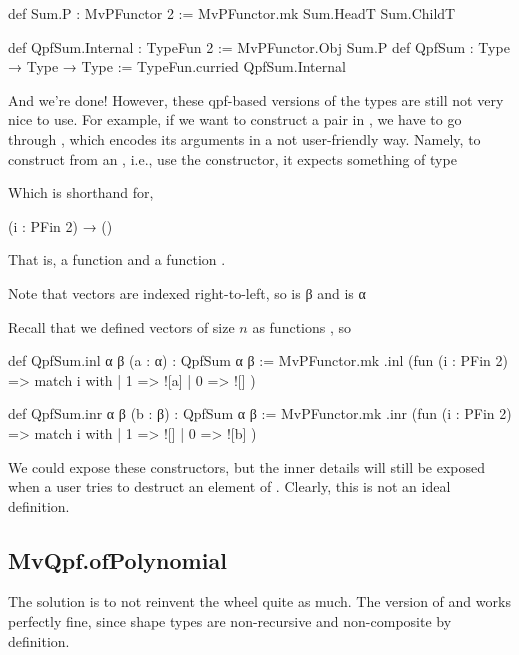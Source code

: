 \begin{leancode}
    def Sum.P  : MvPFunctor 2 := MvPFunctor.mk Sum.HeadT  Sum.ChildT
    
    def QpfSum.Internal : TypeFun 2   := MvPFunctor.Obj Sum.P
    def QpfSum : Type → Type → Type := TypeFun.curried QpfSum.Internal
\end{leancode}

And we're done! However, these qpf-based versions of the types are still not very nice to use.
For example, if we want to construct a pair in , we have to go through ,
which encodes its arguments in a not user-friendly way. 
Namely, to construct  from an , i.e., use the  constructor, 
it expects something of type
\begin{center}
\end{center}
Which is shorthand for, 
\begin{center}
    (i : PFin 2) → ()
\end{center}
That is, a function  and a function .
\begin{remark}
    Note that vectors are indexed right-to-left, so  is β
    and  is α
\end{remark}

Recall that we defined vectors of size $n$ as functions , so 


\begin{leancode}
    def QpfSum.inl {α β} (a : α) : QpfSum α β :=
      MvPFunctor.mk .inl (fun (i : PFin 2) => match i with
        | 1 => ![a]
        | 0 => ![]
      )
    
    def QpfSum.inr {α β} (b : β) : QpfSum α β :=
      MvPFunctor.mk .inr (fun (i : PFin 2) => match i with
        | 1 => ![]
        | 0 => ![b]
      )
\end{leancode}


We could expose these constructors, but the inner details will still be exposed
when a user tries to destruct an element of .
Clearly, this is not an ideal definition.

\subsection{MvQpf.ofPolynomial}
The solution is to not reinvent the wheel quite as much.
The  version of  and  works perfectly fine,
since shape types are non-recursive and non-composite by definition.


